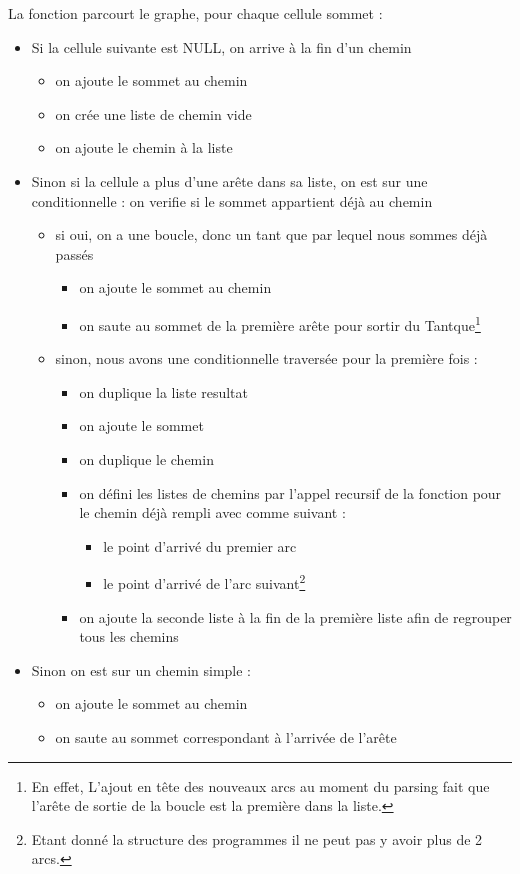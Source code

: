 \documentclass[a4paper,11pt]{article}
\begin{document}
		La fonction parcourt le graphe, pour chaque cellule sommet :
	\begin{itemize}
	\item Si la cellule suivante est NULL, on arrive à la fin d'un chemin
		\begin{itemize}
		\item on ajoute le sommet au chemin
		\item on crée une liste de chemin vide
		\item on ajoute le chemin à la liste
		\end{itemize}
	\item Sinon si la cellule a plus d'une arête dans sa liste, on est sur une conditionnelle : on verifie si le sommet appartient déjà au chemin
			\begin{itemize}
			\item si oui, on a une boucle, donc un tant que par lequel nous sommes déjà passés
				\begin{itemize}
				\item on ajoute le sommet au chemin
				\item on saute au sommet de la première arête pour sortir du Tantque\footnote{En effet, L'ajout en tête des nouveaux arcs au moment du parsing fait que l'arête de sortie de la boucle est la première dans la liste.}
				\end{itemize}
			\item sinon, nous avons une conditionnelle traversée pour la première fois :
				\begin{itemize}
				\item on duplique la liste resultat
				\item on ajoute le sommet
				\item on duplique le chemin
				\item on défini les listes de chemins par l'appel recursif de la fonction pour le chemin déjà rempli avec comme suivant :
					\begin{itemize}
					\item le point d'arrivé du premier arc
					\item le point d'arrivé de l'arc suivant\footnote{Etant donné la structure des programmes il ne peut pas y avoir plus de 2 arcs.}
					\end{itemize}
				\item on ajoute la seconde liste à la fin de la première liste afin de regrouper tous les chemins
				\end{itemize}
			\end{itemize}
		\item Sinon on est sur un chemin simple :
			\begin{itemize}
			\item on ajoute le sommet au chemin
			\item on saute au sommet correspondant à l'arrivée de l'arête
			\end{itemize}
		\end{itemize}
\end{document}
